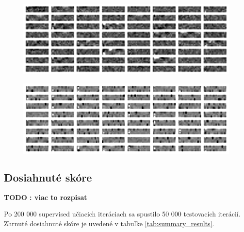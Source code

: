 \documentclass[10pt,a4paper]{article}
\begin{document}
\begin{figure}[!htb]
\centering
\begin{minipage}{.5\textwidth}
  \centering
  \includegraphics[scale=0.4]{../../diagrams/layer_1_fnn_sparse.png}
  \label{img:FNN sparse weights visualisation}
\end{minipage}%
\begin{minipage}{.5\textwidth}
  \centering
  \includegraphics[scale=0.4]{../../diagrams/layer_1_hnn_sparse.png}
  \label{img:AE+FNN sparse weights visualisation}
\end{minipage}
\end{figure}



\subsection{Dosiahnuté skóre}

{\bf TODO : viac to rozpisat}

Po 200 000 supervised učiacich iteráciach sa spustilo 50 000 testovacích iterácií.
Zhrnuté dosiahnuté skóre je uvedené v tabuľke \ref{tab:summary_results}.
\end{document}
